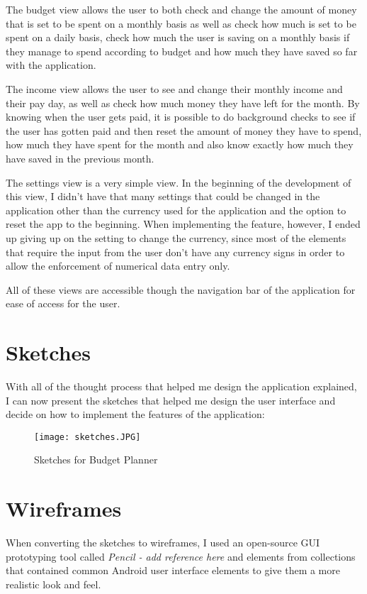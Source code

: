 The budget view allows the user to both check and change the amount of money that is set to be spent on a monthly basis as well as check how much is set to be spent on a daily basis, check how much the user is saving on a monthly basis if they manage to spend according to budget and how much they have saved so far with the application.

The income view allows the user to see and change their monthly income and their pay day, as well as check how much money they have left for the month. By knowing when the user gets paid, it is possible to do background checks to see if the user has gotten paid and then reset the amount of money they have to spend, how much they have spent for the month and also know exactly how much they have saved in the previous month.

The settings view is a very simple view. In the beginning of the development of this view, I didn't have that many settings that could be changed in the application other than the currency used for the application and the option to reset the app to the beginning. When implementing the feature, however, I ended up giving up on the setting to change the currency, since most of the elements that require the input from the user don't have any currency signs in order to allow the enforcement of numerical data entry only.

All of these views are accessible though the navigation bar of the application for ease of access for the user.

\section{Sketches}
With all of the thought process that helped me design the application explained, I can now present the sketches that helped me design the user interface and decide on how to implement the features of the application:

\begin{figure}
  \caption{Sketches for Budget Planner}
  \centering
  \texttt{[image: sketches.JPG]}
\end{figure}

\section{Wireframes}
When converting the sketches to wireframes, I used an open-source GUI prototyping tool called \emph{Pencil - add reference here} and elements from collections that contained common Android user interface elements to give them a more realistic look and feel.

